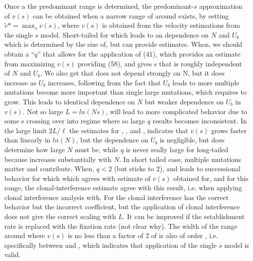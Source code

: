 \documentclass[12pt, one column]{article}
\begin{document}
Once a the predominant range is determined, the predominant-$s$ approximation of $v(s)$ can be obtained when a narrow range of around exists, by setting $\tilde{v}* = \max_{s} v(s)$, where $v(s)$ is obtained from the velocity estimations from the single $s$ model.  Short-tailed for which leads to an dependence on $N$ and $U_b$ which is determined by  the size of, but can provide estimates.  When, we should obtain a “$q$” that allows for the application of (41), which provides an estimate  from maximizing $v(s)$ providing (58), and gives s that is roughly independent of $N$ and $U_b$.  We also get that does not depend strongly on N, but it does increase as $U_b$ increases, following from the fact that $U_b$ leads to more multiple mutations become more important than single large mutations, which requires to grow.  This leads to identical dependence on $N$ but weaker dependence on $U_b$ in $v(s)$.  Not so large $L=ln(Ns)$, will lead to more complicated behavior due to some s crossing over into regime where so large $q$ results becomes inconsistent.  In the large limit $2L/\ell$ the estimates for , , and , indicates that $v(s)$ grows faster than linearly in $ln(N)$, but the dependence on $U_b$ is negligible, but does determine how large $N$ must be, while $q$ is never really large for long-tailed because  increases substantially with $N$.  In short tailed case, multiple mutations matter and contribute.  When, $q<2$ (but sticks to 2), and leads to successional behavior for which which agrees with estimate of $v(s)$ obtained for, and for this range, the clonal-interference estimate agree with this result, i.e. when applying clonal interference analysis with.  
For the clonal interference has the correct behavior but the incorrect coefficient, but the application of clonal interference does not give the correct scaling with $L$.  It can be improved if the establishment rate is replaced with the fixation rate (not clear why).  The width of the range around where $v(s)$ is no less than a factor of 2 of is also of order , i.e. specifically between and , which indicates that application of the single $s$ model is valid.
\end{document}
